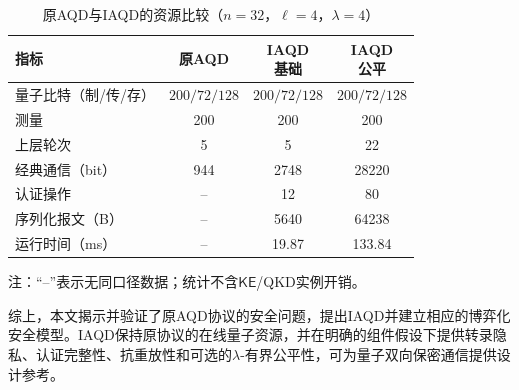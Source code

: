 \documentclass[UTF8,10pt,a4paper]{ctexart}
\theoremstyle{aqdplain}
\begin{document}
\begin{table}[t]
\centering
\caption{原AQD与IAQD的资源比较（$n=32$，$\ell=4$，$\lambda=4$）}
\label{tab:resource-comparison}
\scriptsize
\setlength{\tabcolsep}{2.2pt}
\renewcommand{\arraystretch}{1.08}
\begin{tabularx}{\columnwidth}{@{}Xccc@{}}
\toprule
指标 & 原AQD & \shortstack{IAQD\\基础} & \shortstack{IAQD\\公平} \\
\midrule
量子比特（制/传/存）
& $200/72/128$ & $200/72/128$ & $200/72/128$ \\
测量
& 200 & 200 & 200 \\
上层轮次
& 5 & 5 & 22 \\
经典通信（bit）
& 944 & 2748 & 28220 \\
认证操作
& -- & 12 & 80 \\
序列化报文（B）
& -- & 5640 & 64238 \\
运行时间（ms）
& -- & 19.87 & 133.84 \\
\bottomrule
\end{tabularx}
\vspace{1pt}
\parbox{\columnwidth}{\scriptsize
注：``--''表示无同口径数据；统计不含$\mathsf{KE}$/QKD实例开销。}
\end{table}

综上，本文揭示并验证了原AQD协议的安全问题，提出IAQD并建立相应的博弈化安全模型。IAQD保持原协议的在线量子资源，并在明确的组件假设下提供转录隐私、认证完整性、抗重放性和可选的$\lambda$-有界公平性，可为量子双向保密通信提供设计参考。



\end{document}
